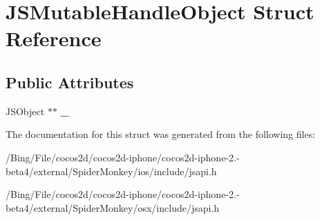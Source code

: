 \hypertarget{struct_j_s_mutable_handle_object}{\section{J\-S\-Mutable\-Handle\-Object Struct Reference}
\label{struct_j_s_mutable_handle_object}
}
\subsection*{Public Attributes}
\begin{DoxyCompactItemize}
\item 
\hypertarget{struct_j_s_mutable_handle_object_a9ad7b36f7a21c7411b879078297254f8}{J\-S\-Object $\ast$$\ast$ {\bfseries \-\_\-}}\label{struct_j_s_mutable_handle_object_a9ad7b36f7a21c7411b879078297254f8}

\end{DoxyCompactItemize}


The documentation for this struct was generated from the following files\-:\begin{DoxyCompactItemize}
\item 
/\-Bing/\-File/cocos2d/cocos2d-\/iphone/cocos2d-\/iphone-\/2.-\/beta4/external/\-Spider\-Monkey/ios/include/jsapi.\-h\item 
/\-Bing/\-File/cocos2d/cocos2d-\/iphone/cocos2d-\/iphone-\/2.-\/beta4/external/\-Spider\-Monkey/osx/include/jsapi.\-h\end{DoxyCompactItemize}
